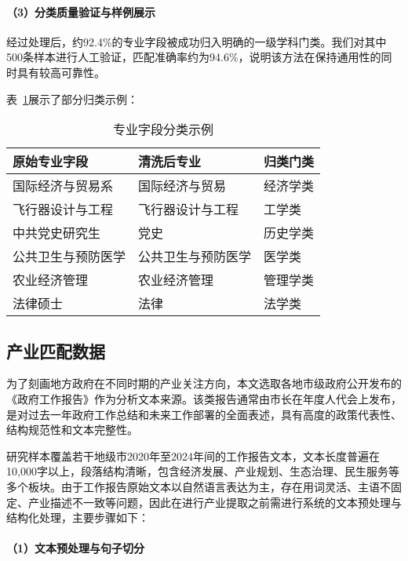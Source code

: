 \documentclass[a4paper,11pt, fontset=fandol]{ctexart}
\begin{document}
\paragraph{（3）分类质量验证与样例展示}

经过处理后，约92.4\%的专业字段被成功归入明确的一级学科门类。我们对其中500条样本进行人工验证，匹配准确率约为94.6\%，说明该方法在保持通用性的同时具有较高可靠性。

\vspace{0.5em}
\noindent 表~\ref{tab:major_classification}展示了部分归类示例：

\begin{table}[H]
\centering
\caption{专业字段分类示例}
\label{tab:major_classification}
\begin{tabular}{p{5cm}p{5cm}p{4cm}}
\hline
\textbf{原始专业字段} & \textbf{清洗后专业} & \textbf{归类门类} \\

\hline
国际经济与贸易系 & 国际经济与贸易 & 经济学类 \\
飞行器设计与工程 & 飞行器设计与工程 & 工学类 \\
中共党史研究生 & 党史 & 历史学类 \\
公共卫生与预防医学 & 公共卫生与预防医学 & 医学类 \\
农业经济管理 & 农业经济管理 & 管理学类 \\
法律硕士 & 法律 & 法学类 \\
\hline
\end{tabular}
\end{table}



\subsection{产业匹配数据}


为了刻画地方政府在不同时期的产业关注方向，本文选取各地市级政府公开发布的《政府工作报告》作为分析文本来源。该类报告通常由市长在年度人代会上发布，是对过去一年政府工作总结和未来工作部署的全面表述，具有高度的政策代表性、结构规范性和文本完整性。

研究样本覆盖若干地级市2020年至2024年间的工作报告文本，文本长度普遍在10,000字以上，段落结构清晰，包含经济发展、产业规划、生态治理、民生服务等多个板块。由于工作报告原始文本以自然语言表达为主，存在用词灵活、主语不固定、产业描述不一致等问题，因此在进行产业提取之前需进行系统的文本预处理与结构化处理，主要步骤如下：

\paragraph{（1）文本预处理与句子切分}
\end{document}
